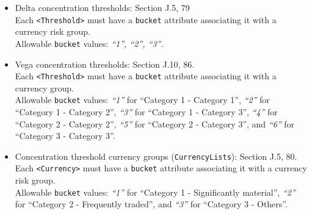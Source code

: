 \begin{itemize}
  \item Delta concentration thresholds: Section J.5, 79 \\
    Each {\tt <Threshold>} must have a {\tt bucket} attribute associating it with a currency risk group. \\
    Allowable {\tt bucket} values: \emph{``1'', ``2'', ``3''}.
  \item Vega concentration thresholds: Section J.10, 86. \\
    Each {\tt <Threshold>} must have a {\tt bucket} attribute associating it with a currency group. \\
    Allowable {\tt bucket} values: \emph{``1''} for ``Category 1 - Category 1'', \emph{``2''} for ``Category 1 - Category 2'', \emph{``3''} for ``Category 1 - Category 3'', \emph{``4''} for ``Category 2 - Category 2'', \emph{``5''} for ``Category 2 - Category 3'', and \emph{``6''} for ``Category 3 - Category 3''.
  \item Concentration threshold currency groups ({\tt CurrencyLists}): Section J.5, 80. \\
    Each {\tt <Currency>} must have a {\tt bucket} attribute associating it with a currency risk group. \\
    Allowable {\tt bucket} values: \emph{``1''} for ``Category 1 - Significantly material'', \emph{``2''} for ``Category 2 - Frequently traded'', and \emph{``3''} for ``Category 3 - Others''.
\end{itemize}

